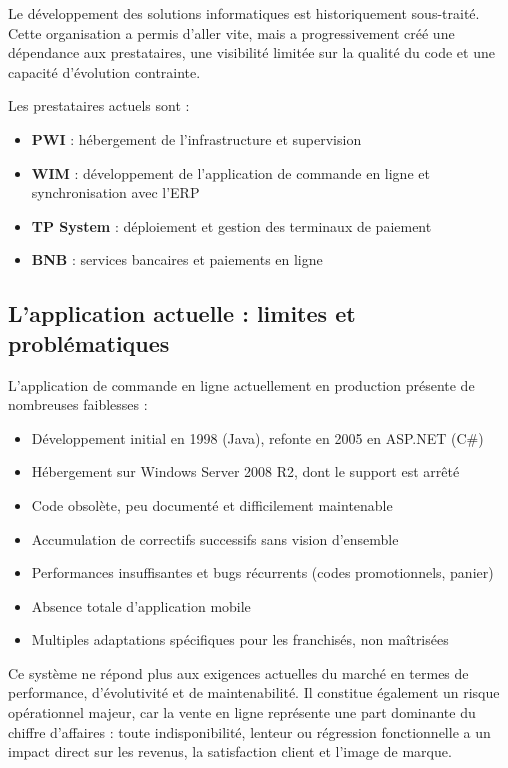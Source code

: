 Le développement des solutions informatiques est historiquement sous-traité. Cette organisation a permis d’aller vite, mais a progressivement créé une dépendance aux prestataires, une visibilité limitée sur la qualité du code et une capacité d’évolution contrainte.

Les prestataires actuels sont :
\begin{itemize}
    \item \textbf{PWI} : hébergement de l’infrastructure et supervision
    \item \textbf{WIM} : développement de l’application de commande en ligne et synchronisation avec l’ERP
    \item \textbf{TP System} : déploiement et gestion des terminaux de paiement
    \item \textbf{BNB} : services bancaires et paiements en ligne
\end{itemize}

\subsection{L’application actuelle : limites et problématiques}
L’application de commande en ligne actuellement en production présente de nombreuses faiblesses :
\begin{itemize}
    \item Développement initial en 1998 (Java), refonte en 2005 en ASP.NET (C\#)
    \item Hébergement sur Windows Server 2008 R2, dont le support est arrêté
    \item Code obsolète, peu documenté et difficilement maintenable
    \item Accumulation de correctifs successifs sans vision d’ensemble
    \item Performances insuffisantes et bugs récurrents (codes promotionnels, panier)
    \item Absence totale d’application mobile
    \item Multiples adaptations spécifiques pour les franchisés, non maîtrisées
\end{itemize}

Ce système ne répond plus aux exigences actuelles du marché en termes de performance, d’évolutivité et de maintenabilité. Il constitue également un risque opérationnel majeur, car la vente en ligne représente une part dominante du chiffre d’affaires : toute indisponibilité, lenteur ou régression fonctionnelle a un impact direct sur les revenus, la satisfaction client et l’image de marque.

